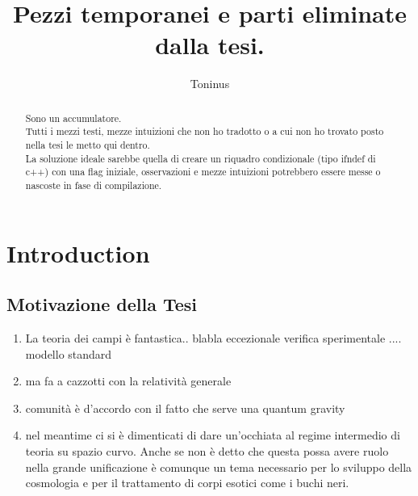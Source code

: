 \documentclass[Main]{subfiles}
\title{Pezzi temporanei e parti eliminate dalla tesi. }
\author{Toninus}
\begin{document}
\maketitle
\begin{abstract}
	Sono un accumulatore.\\
	Tutti i mezzi testi, mezze intuizioni che non ho tradotto o a cui non ho trovato posto nella tesi le metto qui dentro.\\
	\vspace{2mm}
	La soluzione ideale sarebbe quella di creare un riquadro condizionale (tipo ifndef di c++) con una flag iniziale, osservazioni e mezze intuizioni potrebbero essere messe o nascoste in fase di compilazione.
	
\end{abstract}
\tableofcontents

\chapter*{Introduction}
%

\section{Motivazione della Tesi}
\begin{enumerate}
	\item La teoria dei campi è fantastica.. blabla  eccezionale verifica sperimentale .... modello standard
	\item ma fa a cazzotti con la relatività generale
	\item comunità è d'accordo con il fatto che serve una quantum gravity
	\item nel meantime ci si è dimenticati di dare un'occhiata al regime intermedio di teoria su spazio curvo. Anche se non è detto che questa possa avere ruolo nella grande unificazione è comunque un tema necessario per lo sviluppo della cosmologia e per il trattamento di corpi esotici come i buchi neri.
\end{enumerate}
\end{document}
